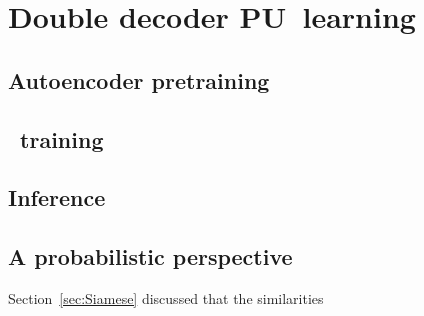 \section{Double decoder PU~learning}\label{sec:ddPU}



\subsection{Autoencoder pretraining}





\subsection{\Repel\ training}



\subsection{Inference}




\subsection{A probabilistic perspective}

Section~\ref{sec:Siamese} discussed that the similarities
